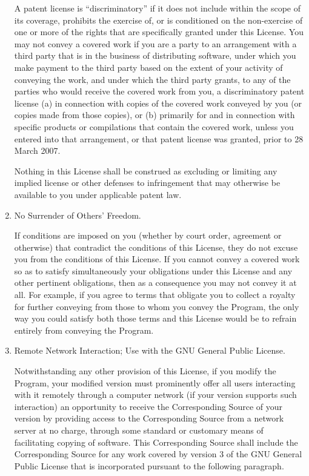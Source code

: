 \documentclass[a4paper,twocolumn]{article}
\begin{document}
\begin{enumerate}
A patent license is ``discriminatory'' if it does not include within
the scope of its coverage, prohibits the exercise of, or is
conditioned on the non-exercise of one or more of the rights that are
specifically granted under this License.  You may not convey a covered
work if you are a party to an arrangement with a third party that is
in the business of distributing software, under which you make payment
to the third party based on the extent of your activity of conveying
the work, and under which the third party grants, to any of the
parties who would receive the covered work from you, a discriminatory
patent license (a) in connection with copies of the covered work
conveyed by you (or copies made from those copies), or (b) primarily
for and in connection with specific products or compilations that
contain the covered work, unless you entered into that arrangement,
or that patent license was granted, prior to 28 March 2007.

Nothing in this License shall be construed as excluding or limiting
any implied license or other defenses to infringement that may
otherwise be available to you under applicable patent law.

\item No Surrender of Others' Freedom.

If conditions are imposed on you (whether by court order, agreement or
otherwise) that contradict the conditions of this License, they do not
excuse you from the conditions of this License.  If you cannot convey a
covered work so as to satisfy simultaneously your obligations under this
License and any other pertinent obligations, then as a consequence you may
not convey it at all.  For example, if you agree to terms that obligate you
to collect a royalty for further conveying from those to whom you convey
the Program, the only way you could satisfy both those terms and this
License would be to refrain entirely from conveying the Program.

\item Remote Network Interaction; Use with the GNU General Public License.

Notwithstanding any other provision of this License, if you modify the
Program, your modified version must prominently offer all users interacting
with it remotely through a computer network (if your version supports such
interaction) an opportunity to receive the Corresponding Source of your
version by providing access to the Corresponding Source from a network
server at no charge, through some standard or customary means of
facilitating copying of software.  This Corresponding Source shall include
the Corresponding Source for any work covered by version 3 of the GNU
General Public License that is incorporated pursuant to the following
paragraph.


\end{enumerate}
\end{document}
